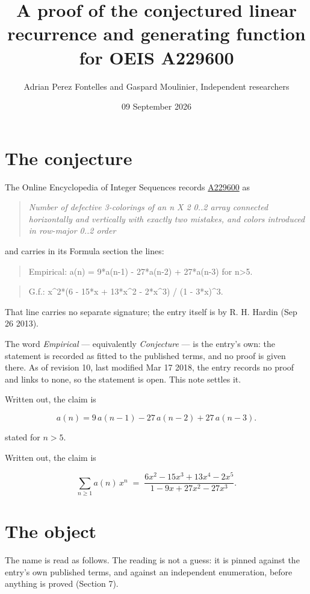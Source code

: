 \documentclass[11pt]{article}
\title{A proof of the conjectured linear recurrence and generating function for OEIS A229600}
\author{Adrian Perez Fontelles and Gaspard Moulinier, Independent researchers}
\date{09 September 2026}
\theoremstyle{definition}
\begin{document}
\maketitle
\section{The conjecture}

The Online Encyclopedia of Integer Sequences records \href{https://oeis.org/A229600}{A229600} as

\begin{quote}\itshape Number of defective 3-colorings of an n X 2 0..2 array connected horizontally and vertically with exactly two mistakes, and colors introduced in row-major 0..2 order\end{quote}

and carries in its Formula section the lines:

\begin{quote}\ttfamily Empirical: a(n) = 9*a(n-1) - 27*a(n-2) + 27*a(n-3) for n>5.\end{quote}

\begin{quote}\ttfamily G.f.: x\textasciicircum{}2*(6 - 15*x + 13*x\textasciicircum{}2 - 2*x\textasciicircum{}3) / (1 - 3*x)\textasciicircum{}3.\end{quote}

That line carries no separate signature; the entry itself is by R. H. Hardin (Sep 26 2013).

The word {\itshape Empirical} --- equivalently {\itshape Conjecture} --- is the entry's own: the statement is recorded as fitted to the published terms, and no proof is given there. As of revision 10, last modified Mar 17 2018, the entry records no proof and links to none, so the statement is open. This note settles it.

Written out, the claim is

\[a(n) = 9\,a(n-1) - 27\,a(n-2) + 27\,a(n-3).\]

stated for $n > 5$.

Written out, the claim is

\[\sum_{n \ge 1} a(n)\,x^n \;=\; \frac{6x^{2} - 15x^{3} + 13x^{4} - 2x^{5}}{1 - 9x + 27x^{2} - 27x^{3}}.\]

\section{The object}

The name is read as follows. The reading is not a guess: it is pinned against the entry's own published terms, and against an independent enumeration, before anything is proved (Section 7).
\end{document}
